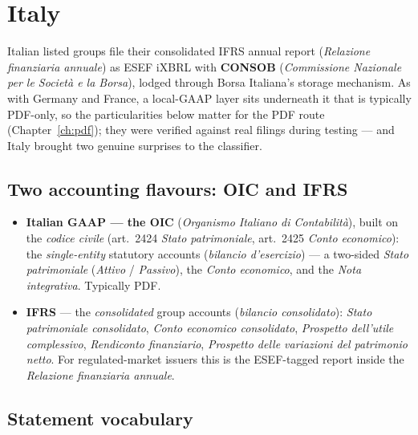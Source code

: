 \documentclass[11pt,a4paper]{report}
\begin{document}
\section{Italy}
\label{sec:esef-italy}

Italian listed groups file their consolidated IFRS annual report (\emph{Relazione finanziaria annuale}) as
ESEF iXBRL with \textbf{CONSOB} (\emph{Commissione Nazionale per le Società e la Borsa}), lodged through
Borsa Italiana's storage mechanism. As with Germany and France, a local-GAAP layer sits underneath it that is
typically PDF-only, so the particularities below matter for the PDF route (Chapter~\ref{ch:pdf}); they were
verified against real filings during testing --- and Italy brought two genuine surprises to the classifier.

\subsection{Two accounting flavours: OIC and IFRS}

\begin{itemize}
  \item \textbf{Italian GAAP --- the OIC} (\emph{Organismo Italiano di Contabilità}), built on the
    \emph{codice civile} (art.~2424 \emph{Stato patrimoniale}, art.~2425 \emph{Conto economico}): the
    \emph{single-entity} statutory accounts (\emph{bilancio d'esercizio}) --- a two-sided \emph{Stato
    patrimoniale} (\emph{Attivo} / \emph{Passivo}), the \emph{Conto economico}, and the \emph{Nota
    integrativa}. Typically PDF.
  \item \textbf{IFRS} --- the \emph{consolidated} group accounts (\emph{bilancio consolidato}): \emph{Stato
    patrimoniale consolidato}, \emph{Conto economico consolidato}, \emph{Prospetto dell'utile complessivo},
    \emph{Rendiconto finanziario}, \emph{Prospetto delle variazioni del patrimonio netto}. For
    regulated-market issuers this is the ESEF-tagged report inside the \emph{Relazione finanziaria annuale}.
\end{itemize}

\subsection{Statement vocabulary}
\end{document}
